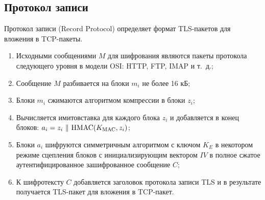 \subsection{Протокол записи}

Протокол записи (Record Protocol) определяет формат TLS-пакетов для вложения в TCP-пакеты.

\begin{enumerate}
    \item Исходными сообщениями $M$ для шифрования являются пакеты протокола следующего уровня в модели OSI: HTTP, FTP, IMAP и т.~д.;
    \item Сообщение $M$ разбивается на блоки $m_i$ не более 16 кБ;
    \item Блоки $m_i$ сжимаются алгоритмом компрессии в блоки $z_i$;
    \item Вычисляется имитовставка для каждого блока $z_i$ и добавляется в конец блоков: $a_i = z_i ~\|~ \textrm{HMAC}(K_{\textrm{MAC}}, z_i)$;
    \item Блоки $a_i$ шифруются симметричным алгоритмом с ключом $K_E$ в некотором режиме сцепления блоков с инициализирующим вектором $IV$ в полное сжатое аутентифицированное зашифрованное сообщение $C$;
    \item К шифротексту $C$ добавляется заголовок протокола записи TLS и в результате получается TLS-пакет для вложения в TCP-пакет.
\end{enumerate}
